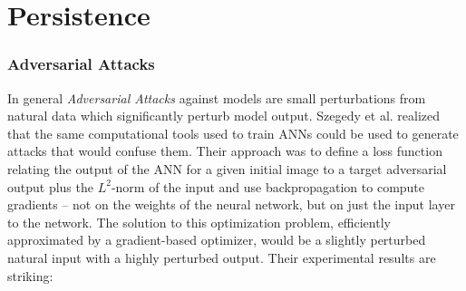 \chapter{Persistence}

\label{Chapter2} %
\subsection{Adversarial Attacks }

In general \emph{Adversarial Attacks} against models
are small perturbations from natural data which significantly perturb
model output. 
Szegedy et al. \cite{Szegedy2013} realized that the same computational tools
used to train ANNs could be used to generate attacks that would
confuse them. Their approach was to define a loss function
relating the output of the ANN for a given initial image to a target adversarial 
output plus the $L^2$-norm of the input and use backpropagation to
compute gradients -- not on the weights of the neural network, but on
just the input layer to the network. The solution to this optimization
problem, efficiently approximated by a gradient-based optimizer, would
be a slightly perturbed natural input with a highly perturbed
output. Their experimental results are striking:\\


